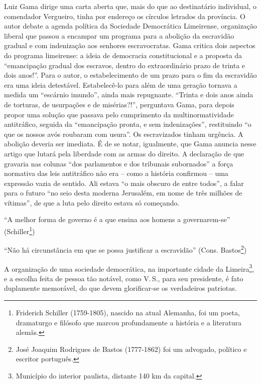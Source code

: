 \begin{didascalia}
Luiz Gama dirige uma carta aberta que, mais do que ao destinatário
individual, o comendador Vergueiro, tinha por endereço os círculos
letrados da província. O autor debate a agenda política da Sociedade
Democrática Limeirense, organização liberal que passou a encampar um
programa para a abolição da escravidão gradual e com indenização aos
senhores escravocratas. Gama critica dois aspectos do programa
limeirense: a ideia de democracia constitucional e a proposta da
``emancipação gradual dos escravos, dentro do extraordinário prazo de
trinta e dois anos!''. Para o autor, o estabelecimento de um prazo para o
fim da escravidão era uma ideia detestável. Estabelecê-lo para além de
uma geração tornava a medida um ``escárnio imundo'', ainda mais
repugnante. ``Trinta e dois anos ainda de torturas, de usurpações e de
misérias?!'', perguntava Gama, para depois propor uma solução que passava
pelo cumprimento da multinormatividade antitráfico, seguida da
``emancipação pronta, e sem indenizações'', restituindo ``o que os nossos
avós roubaram com usura''. Os escravizados tinham urgência. A abolição
deveria ser imediata. É de se notar, igualmente, que Gama anuncia nesse
artigo que lutará pela liberdade com as armas do direito. A declaração
de que gravaria nas colunas ``dos parlamentos e dos tribunais subornados''
a força normativa das leis antitráfico não era -- como a história
confirmou -- uma expressão vazia de sentido. Ali estava ``o mais obscuro
de entre todos'', a falar para o futuro ``no seio desta moderna Jerusalém,
em nome de três milhões de vítimas'', de que a luta pelo direito estava
só começando.
\end{didascalia}



``A melhor forma de governo é a que ensina aos homens a governarem-se''
(Schiller\footnote{Friderich Schiller (1759-1805), nascido na atual
  Alemanha, foi um poeta, dramaturgo e filósofo que marcou profundamente
  a história e a literatura alemãs.})

``Não há circunstância em que se possa justificar a escravidão'' (Cons.
Bastos\footnote{José Joaquim Rodrigues de Bastos (1777-1862) foi um
  advogado, político e escritor português.})

A organização de uma sociedade democrática, na importante cidade da
Limeira\footnote{Município do interior paulista, distante 140 km da
  capital.}, e a escolha feita de pessoa tão notável, como V.\,S., para
seu presidente, é fato duplamente memorável, do que devem glorificar-se
os verdadeiros patriotas.

